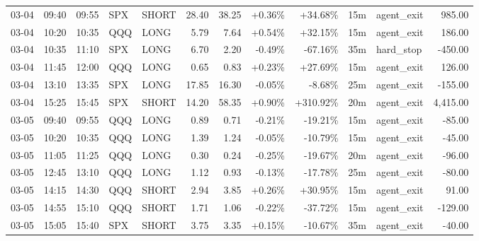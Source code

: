 \documentclass[11pt,a4paper]{article}
\begin{document}
\begin{center}
\begin{longtable}{>{\color{txtmain}}l l l l l r r r r r >{\color{txtmain}}l r}
03-04 & 09:40 & 09:55 & SPX & SHORT & 28.40 & 38.25 & \textcolor{wingreen}{+0.36\%} & \textcolor{wingreen}{+34.68\%} & 15m & agent\_exit & \textcolor{wingreen}{985.00} \\
03-04 & 10:20 & 10:35 & QQQ & LONG & 5.79 & 7.64 & \textcolor{wingreen}{+0.54\%} & \textcolor{wingreen}{+32.15\%} & 15m & agent\_exit & \textcolor{wingreen}{186.00} \\
03-04 & 10:35 & 11:10 & SPX & LONG & 6.70 & 2.20 & \textcolor{lossred}{-0.49\%} & \textcolor{lossred}{-67.16\%} & 35m & hard\_stop & \textcolor{lossred}{-450.00} \\
03-04 & 11:45 & 12:00 & QQQ & LONG & 0.65 & 0.83 & \textcolor{wingreen}{+0.23\%} & \textcolor{wingreen}{+27.69\%} & 15m & agent\_exit & \textcolor{wingreen}{126.00} \\
03-04 & 13:10 & 13:35 & SPX & LONG & 17.85 & 16.30 & \textcolor{lossred}{-0.05\%} & \textcolor{lossred}{-8.68\%} & 25m & agent\_exit & \textcolor{lossred}{-155.00} \\
03-04 & 15:25 & 15:45 & SPX & SHORT & 14.20 & 58.35 & \textcolor{wingreen}{+0.90\%} & \textcolor{wingreen}{+310.92\%} & 20m & agent\_exit & \textcolor{wingreen}{4,415.00} \\
03-05 & 09:40 & 09:55 & QQQ & LONG & 0.89 & 0.71 & \textcolor{lossred}{-0.21\%} & \textcolor{lossred}{-19.21\%} & 15m & agent\_exit & \textcolor{lossred}{-85.00} \\
03-05 & 10:20 & 10:35 & QQQ & LONG & 1.39 & 1.24 & \textcolor{lossred}{-0.05\%} & \textcolor{lossred}{-10.79\%} & 15m & agent\_exit & \textcolor{lossred}{-45.00} \\
03-05 & 11:05 & 11:25 & QQQ & LONG & 0.30 & 0.24 & \textcolor{lossred}{-0.25\%} & \textcolor{lossred}{-19.67\%} & 20m & agent\_exit & \textcolor{lossred}{-96.00} \\
03-05 & 12:45 & 13:10 & QQQ & LONG & 1.12 & 0.93 & \textcolor{lossred}{-0.13\%} & \textcolor{lossred}{-17.78\%} & 25m & agent\_exit & \textcolor{lossred}{-80.00} \\
03-05 & 14:15 & 14:30 & QQQ & SHORT & 2.94 & 3.85 & \textcolor{wingreen}{+0.26\%} & \textcolor{wingreen}{+30.95\%} & 15m & agent\_exit & \textcolor{wingreen}{91.00} \\
03-05 & 14:55 & 15:10 & QQQ & SHORT & 1.71 & 1.06 & \textcolor{lossred}{-0.22\%} & \textcolor{lossred}{-37.72\%} & 15m & agent\_exit & \textcolor{lossred}{-129.00} \\
03-05 & 15:05 & 15:40 & SPX & SHORT & 3.75 & 3.35 & \textcolor{wingreen}{+0.15\%} & \textcolor{lossred}{-10.67\%} & 35m & agent\_exit & \textcolor{lossred}{-40.00} \\

\end{longtable}
\end{center}
\end{document}
